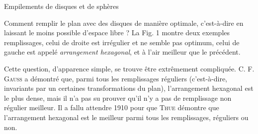 
\begin{His}

{\large {\color{brown}Empilements de disques et de sphères}}

\bigskip


Comment remplir le plan avec des disques de manière
optimale, c'est-à-dire en laissant le moins possible
d'espace libre ? La Fig. 1 montre deux exemples 
remplissages, celui de droite est irrégulier et ne semble pas optimum, celui de gauche est appelé {\em arrangement hexagonal}, et à l'air meilleur que le 
précédent.

Cette question,
d'apparence simple, se trouve être extrêmement compliquée.
C. F. \textsc{Gauss} a démontré que, parmi tous les remplissages
réguliers (c'est-à-dire, invariants par un certaines transformations
du plan), l'arrangement hexagonal est le plus dense, mais
il n'a pas su prouver qu'il n'y a pas de remplissage non régulier
meilleur.  Il a fallu attendre 1910 pour que \textsc{Thue} démontre que 
l'arrangement hexagonal est le meilleur parmi tous les remplissages,
réguliers ou non.


\end{His}
